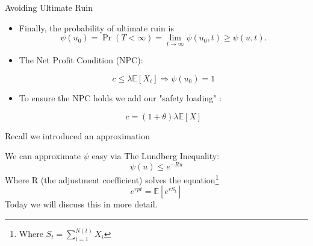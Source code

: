 \documentclass[11pt]{beamer}
\newcommand{\expect}{\mathbb{E}}
\begin{document}
\begin{frame}{Avoiding Ultimate Ruin}

\begin{itemize}

\item Finally, the probability of \alert{ultimate} ruin is
$$\psi(u_0) =\Pr(T<\infty)= \lim_{t\rightarrow \infty} \psi(u_0,t) \ge \psi(u,t).$$

\vfill

\item The Net Profit Condition (NPC):

\begin{equation*}\label{Def:NPC}
c \leq \lambda \expect[X_i] \Rightarrow \psi(u_0)=1
\end{equation*} 
\vfill
\item To ensure the NPC holds we add our "safety loading" : 

\begin{equation*}
c=(1+\theta)\lambda \expect[X]
\end{equation*}
\end{itemize}

\end{frame}
\begin{frame}{Recall we introduced an approximation}

We can approximate $\psi$ easy via \alert{The Lundberg Inequality}:
\vfill
\begin{equation*}\label{Def:LI1}
\psi(u) \leq e^{-Ru } 
\end{equation*} 
\vfill
Where R (the adjustment coefficient) solves the equation\footnote{Where $S_t=\sum_{i=1}^{N(t)} X_i$}
\begin{equation*}\label{Def:NPC}
e^{r p t} = \expect[e^{r S_t }]
\end{equation*} 
\vfill
Today we will discuss this in more detail.

\end{frame}
\end{document}
